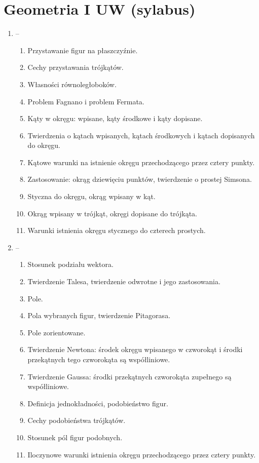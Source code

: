 \documentclass{parchment}
\begin{document}
\section{Geometria I UW (sylabus)}
\begin{enumerate}
	\item -- \begin{enumerate}
		\item Przystawanie figur na płaszczyźnie.
		\item Cechy przystawania trójkątów.
		\item Własności równoległoboków.
		\item Problem Fagnano i problem Fermata.
		\item Kąty w okręgu: wpisane, kąty środkowe i kąty dopisane.
		\item Twierdzenia o kątach wpisanych, kątach środkowych i kątach dopisanych do okręgu.
		\item Kątowe warunki na istnienie okręgu przechodzącego przez cztery punkty.
		\item Zastosowanie: okrąg dziewięciu punktów, twierdzenie o prostej Simsona.
		\item Styczna do okręgu, okrąg wpisany w kąt.
		\item Okrąg wpisany w trójkąt, okręgi dopisane do trójkąta.
		\item Warunki istnienia okręgu stycznego do czterech prostych.
	\end{enumerate}
	\item -- \begin{enumerate}
		\item Stosunek podziału wektora.
		\item Twierdzenie Talesa, twierdzenie odwrotne i jego zastosowania.
		\item Pole.
		\item Pola wybranych figur, twierdzenie Pitagorasa.
		\item Pole zorientowane.
		\item Twierdzenie Newtona: środek okręgu wpisanego w czworokąt i środki przekątnych tego czworokąta są współliniowe.
		\item Twierdzenie Gaussa: środki przekątnych czworokąta zupełnego są współliniowe.
		\item Definicja jednokładności, podobieństwo figur.
		\item Cechy podobieństwa trójkątów.
		\item Stosunek pól figur podobnych.
		\item Iloczynowe warunki istnienia okręgu przechodzącego przez cztery punkty.

\end{enumerate}
\end{enumerate}
\end{document}

